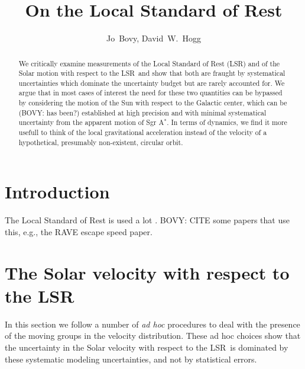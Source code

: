 \documentclass[12pt,preprint]{aastex}
\newcounter{address}
\newcommand{\eg}{e.g.}
\newcommand{\lsr}{LSR}
\newcommand{\sgra}{Sgr A$^*$}
\begin{document}
\title{On the Local Standard of Rest}
\author{
Jo~Bovy\altaffilmark{\ref{NYU},\ref{email}}, 
David~W.~Hogg\altaffilmark{\ref{NYU},\ref{MPIA}}} 

\begin{abstract}
We critically examine measurements of the Local Standard of Rest
(\lsr) and of the Solar motion with respect to the \lsr\ and show that
both are fraught by systematical uncertainties which dominate the
uncertainty budget but are rarely accounted for. We argue that in most
cases of interest the need for these two quantities can be bypassed by
considering the motion of the Sun with respect to the Galactic center,
which can be (BOVY: has been?) established at high precision and with
minimal systematical uncertainty from the apparent motion of \sgra. In
terms of dynamics, we find it more usefull to think of the local
gravitational acceleration instead of the velocity of a hypothetical,
presumably non-existent, circular orbit.
\end{abstract}

\section{Introduction}

The Local Standard of Rest is used a lot
\citep{1998MNRAS.298..387D}. BOVY: CITE some papers that use this,
\eg, the RAVE escape speed paper.


\section{The Solar velocity with respect to the \lsr}

In this section we follow a number of \emph{ad hoc} procedures to deal
with the presence of the moving groups in the velocity
distribution. These ad hoc choices show that the uncertainty in the
Solar velocity with respect to the \lsr\ is dominated by these
systematic modeling uncertainties, and not by statistical errors.
\end{document}
